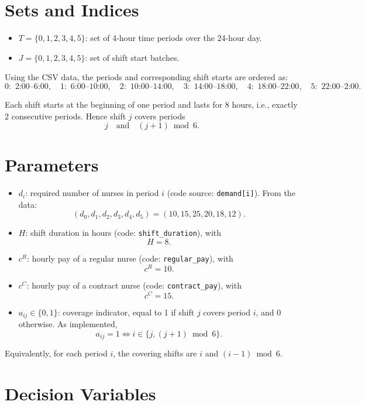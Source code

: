 \section*{Sets and Indices}

\begin{itemize}
    \item \(T=\{0,1,2,3,4,5\}\): set of 4-hour time periods over the 24-hour day.
    \item \(J=\{0,1,2,3,4,5\}\): set of shift start batches.
\end{itemize}

Using the CSV data, the periods and corresponding shift starts are ordered as:
\[
0:\text{ 2:00--6:00},\quad
1:\text{ 6:00--10:00},\quad
2:\text{ 10:00--14:00},\quad
3:\text{ 14:00--18:00},\quad
4:\text{ 18:00--22:00},\quad
5:\text{ 22:00--2:00}.
\]

Each shift starts at the beginning of one period and lasts for 8 hours, i.e., exactly 2 consecutive periods. Hence shift \(j\) covers periods
\[
j \quad \text{and} \quad (j+1)\bmod 6.
\]

\section*{Parameters}

\begin{itemize}
    \item \(d_i\): required number of nurses in period \(i\) (code source: \texttt{demand[i]}). From the data:
    \[
    (d_0,d_1,d_2,d_3,d_4,d_5)=(10,15,25,20,18,12).
    \]
    \item \(H\): shift duration in hours (code: \texttt{shift\_duration}), with
    \[
    H=8.
    \]
    \item \(c^R\): hourly pay of a regular nurse (code: \texttt{regular\_pay}), with
    \[
    c^R=10.
    \]
    \item \(c^C\): hourly pay of a contract nurse (code: \texttt{contract\_pay}), with
    \[
    c^C=15.
    \]
    \item \(a_{ij}\in\{0,1\}\): coverage indicator, equal to 1 if shift \(j\) covers period \(i\), and 0 otherwise. As implemented,
    \[
    a_{ij}=1 \iff i\in\{j,(j+1)\bmod 6\}.
    \]
\end{itemize}

Equivalently, for each period \(i\), the covering shifts are \(i\) and \((i-1)\bmod 6\).

\section*{Decision Variables}

